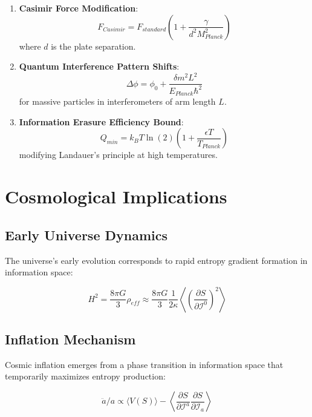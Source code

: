 \documentclass{article}
\begin{document}
\begin{enumerate}
\item \textbf{Casimir Force Modification}:
   \begin{equation}
   F_{Casimir} = F_{standard}\left(1 + \frac{\gamma}{d^2M_{Planck}^2}\right)
   \end{equation}
   where $d$ is the plate separation.

\item \textbf{Quantum Interference Pattern Shifts}:
   \begin{equation}
   \Delta \phi = \phi_0 + \frac{\delta m^2 L^2}{E_{Planck}\hbar^2}
   \end{equation}
   for massive particles in interferometers of arm length $L$.

\item \textbf{Information Erasure Efficiency Bound}:
   \begin{equation}
   Q_{min} = k_B T \ln(2) \left(1 + \frac{\epsilon T}{T_{Planck}}\right)
   \end{equation}
   modifying Landauer's principle at high temperatures.
\end{enumerate}

\section{Cosmological Implications}

\subsection{Early Universe Dynamics}

The universe's early evolution corresponds to rapid entropy gradient formation in information space:

\begin{equation}
H^2 = \frac{8\pi G}{3}\rho_{eff} \approx \frac{8\pi G}{3}\frac{1}{2\kappa}\left\langle\left(\frac{\partial S}{\partial \mathcal{I}^0}\right)^2\right\rangle
\end{equation}

\subsection{Inflation Mechanism}

Cosmic inflation emerges from a phase transition in information space that temporarily maximizes entropy production:

\begin{equation}
\ddot{a}/a \propto \langle V(S) \rangle - \left\langle\frac{\partial S}{\partial \mathcal{I}^a}\frac{\partial S}{\partial \mathcal{I}_a}\right\rangle
\end{equation}
\end{document}
